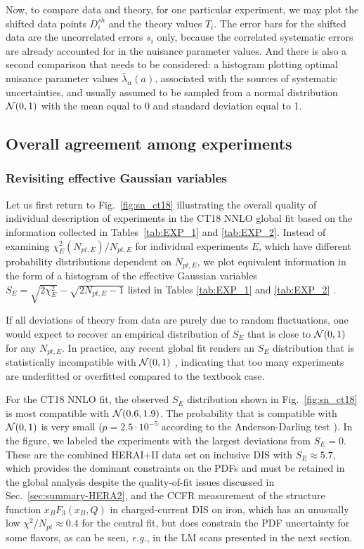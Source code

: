 Now, to compare data and theory, for one particular experiment, we may
plot the shifted data points $D^\mathit{sh}_{i}$ and the theory values
$T_{i}$. The error bars for the shifted data are the uncorrelated
errors $s_{i}$ only, because the correlated systematic errors are
already accounted for in the nuisance parameter values.  And there is
also a second comparison that needs to be considered: a histogram plotting
optimal nuisance parameter values $\bar \lambda_\alpha(a)$, associated
with the sources of systematic uncertainties, and usually assumed to
be sampled from a normal distribution ${\cal N}(0,1)$ with the mean
equal to 0 and standard deviation equal to 1.


\subsection{Overall agreement among experiments \label{sec:QualityOverview}}

\subsubsection{Revisiting effective Gaussian variables}
Let us first return to Fig.~\ref{fig:sn_ct18} illustrating the overall quality of individual description of experiments in the CT18 NNLO global fit based on the information collected in Tables~\ref{tab:EXP_1} and \ref{tab:EXP_2}. 
Instead of examining $\chi^2_E(N_{pt,E})/N_{pt,E}$ for individual experiments $E$, which have different probability distributions dependent on $N_{pt,E}$, we plot equivalent information in the form of a histogram of the effective Gaussian variables $S_E=\sqrt{2\chi^2_E}-\sqrt{2N_{pt,E}-1}$ listed in Tables \ref{tab:EXP_1} and \ref{tab:EXP_2} \cite{Lai:2010vv}.

If all deviations of theory from data are purely due to random
fluctuations, one would expect to recover an empirical distribution of
$S_E$ that is close to ${\cal N}(0,1)$ for any
$N_{pt,E}$. In practice, any recent global fit renders an $S_E$
distribution that is statistically incompatible with ${\cal N}(0,1)$
\cite{Kovarik:2019xvh}, indicating that too many experiments are
underfitted or overfitted compared to the textbook case.

For the CT18 NNLO fit, the observed $S_E$ distribution shown in Fig.~\ref{fig:sn_ct18} is most compatible with ${\cal N}(0.6,1.9)$. The probability that is compatible with ${\cal N}(0,1)$ is very small ($p=2.5\cdot 10^{-5}$ according to the Anderson-Darling test \cite{Kovarik:2019xvh}). In the figure, we labeled the
experiments with the largest deviations from $S_E\! =\! 0$. These are the combined HERAI+II data set on inclusive DIS \cite{Abramowicz:2015mha} with $S_E\approx 5.7$, which provides the dominant constraints on the PDFs and must be retained in the global analysis despite the quality-of-fit issues discussed in Sec.~\ref{sec:summary-HERA2}, and the CCFR measurement \cite{Seligman:1997mc} of the structure function $x_B F_3(x_B,Q)$ in charged-current DIS on iron, which has an unusually low $\chi^2/N_{pt}\approx 0.4$ for the central fit, but does constrain the PDF uncertainty for some flavors, as can be seen, {\it e.g.}, in the LM scans presented in the next section. 

